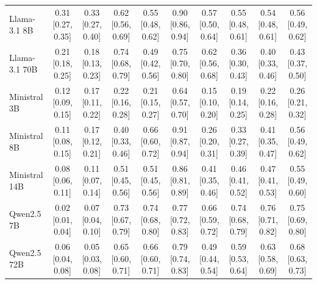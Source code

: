 \documentclass[10pt,a4paper]{article}
\begin{document}
\begin{tiny}
\begin{longtable}{lccccccccc}
Llama-3.1 8B & 0.31 [0.27, 0.35] & 0.33 [0.27, 0.40] & 0.62 [0.56, 0.69] & 0.55 [0.48, 0.62] & 0.90 [0.86, 0.94] & 0.57 [0.50, 0.64] & 0.55 [0.48, 0.61] & 0.54 [0.48, 0.61] & 0.56 [0.49, 0.62] \\
Llama-3.1 70B & 0.21 [0.18, 0.25] & 0.18 [0.13, 0.23] & 0.74 [0.68, 0.79] & 0.49 [0.42, 0.56] & 0.75 [0.70, 0.80] & 0.62 [0.56, 0.68] & 0.36 [0.30, 0.43] & 0.40 [0.33, 0.46] & 0.43 [0.37, 0.50] \\
Ministral 3B & 0.12 [0.09, 0.15] & 0.17 [0.11, 0.22] & 0.22 [0.16, 0.28] & 0.21 [0.15, 0.27] & 0.64 [0.57, 0.70] & 0.15 [0.10, 0.20] & 0.19 [0.14, 0.25] & 0.22 [0.16, 0.28] & 0.26 [0.21, 0.32] \\
Ministral 8B & 0.11 [0.08, 0.15] & 0.17 [0.12, 0.21] & 0.40 [0.33, 0.46] & 0.66 [0.60, 0.72] & 0.91 [0.87, 0.94] & 0.26 [0.20, 0.31] & 0.33 [0.27, 0.39] & 0.41 [0.35, 0.47] & 0.56 [0.49, 0.62] \\
Ministral 14B & 0.08 [0.06, 0.11] & 0.11 [0.07, 0.14] & 0.51 [0.45, 0.56] & 0.51 [0.45, 0.56] & 0.86 [0.81, 0.89] & 0.41 [0.35, 0.46] & 0.46 [0.41, 0.52] & 0.47 [0.41, 0.53] & 0.55 [0.49, 0.60] \\
Qwen2.5 7B & 0.02 [0.01, 0.04] & 0.07 [0.04, 0.10] & 0.73 [0.67, 0.79] & 0.74 [0.68, 0.80] & 0.77 [0.72, 0.83] & 0.66 [0.59, 0.72] & 0.74 [0.68, 0.79] & 0.76 [0.71, 0.82] & 0.75 [0.69, 0.80] \\
Qwen2.5 72B & 0.06 [0.04, 0.08] & 0.05 [0.03, 0.08] & 0.65 [0.60, 0.71] & 0.66 [0.60, 0.71] & 0.79 [0.74, 0.83] & 0.49 [0.44, 0.54] & 0.59 [0.53, 0.64] & 0.63 [0.58, 0.69] & 0.68 [0.63, 0.73] \\
\end{longtable}
\end{tiny}
\end{document}
